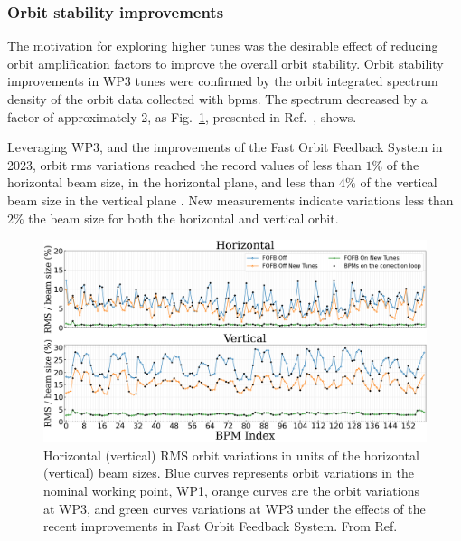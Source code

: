 \subsubsection{Orbit stability improvements}
The motivation for exploring higher tunes was the desirable effect of reducing orbit amplification factors to improve the overall orbit stability. Orbit stability improvements in \gls*{WP3} tunes were confirmed by the orbit integrated spectrum density of the orbit data collected with \glspl*{bpm}. The spectrum decreased by a factor of approximately 2, as Fig.~\ref{fig:integrated_spec}, presented in Ref.~\cite{liu_status_2023}, shows.

Leveraging \gls*{WP3}, and the improvements of the Fast Orbit Feedback System in 2023, orbit \gls*{rms} variations reached the record values of less than $1\%$ of the horizontal beam size, in the horizontal plane, and less than $4\%$ of the vertical beam size in the vertical plane \cite{liu_status_2023}. New measurements indicate variations less than $2\%$ the beam size for both  the horizontal and vertical orbit.

\begin{figure}[htb]
    \centering
    \includegraphics[width=\textwidth]{Images/WEOGA2_f5.png}
    \caption[Horizontal (vertical) RMS orbit variations in units of the horizontal (vertical) beam sizes.]{Horizontal (vertical) RMS orbit variations in units of the horizontal (vertical) beam sizes. Blue curves represents orbit variations in the nominal working point, \gls*{WP1}, orange curves are the orbit variations at \gls*{WP3}, and green curves variations at \gls*{WP3} under the effects of the recent improvements in Fast Orbit Feedback System. From Ref.~\cite{liu_status_2023}}
    \label{fig:integrated_spec}
\end{figure}

